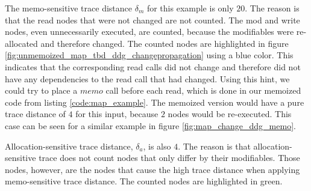 The memo-sensitive trace distance $\delta_m$ for this example is only $20$. The reason is that the read nodes that were not changed are not counted. The mod and write nodes, even unnecessarily executed, are counted, because the modifiables were re-allocated and therefore changed. The counted nodes are highlighted in figure \ref{fig:unmemoized_map_tbd_ddg_changepropagation} using a blue color. This indicates that the corresponding read calls did not change and therefore did not have any dependencies to the read call that had changed. Using this hint, we could try to place a $memo$ call before each read, which is  done in our memoized code from listing \ref{code:map_example}. The memoized version would have a pure trace distance of $4$ for this input, because $2$ nodes would be re-executed. This case can be seen for a similar example in figure \ref{fig:map_change_ddg_memo}. 

Allocation-sensitive trace distance, $\delta_a$, is also $4$. The reason is that allocation-sensitive trace does not count nodes that only differ by their modifiables. Those nodes, however, are the nodes that cause the high trace distance when applying memo-sensitive trace distance. The counted nodes are highlighted in green.  

